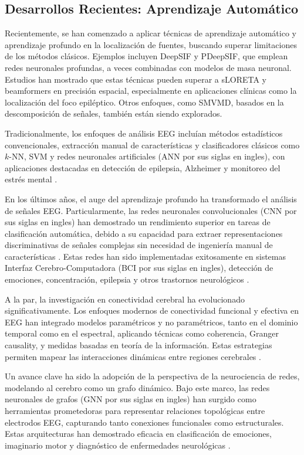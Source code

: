 \subsection{Desarrollos Recientes: Aprendizaje Automático}

Recientemente, se han comenzado a aplicar técnicas de aprendizaje automático y aprendizaje profundo en la localización de fuentes\cite{Sun2022DeepNN}, buscando superar limitaciones de los métodos clásicos. Ejemplos incluyen DeepSIF\cite{Sun2022DeepNN} y PDeepSIF\cite{sun2023pdeepsif}, que emplean redes neuronales profundas, a veces combinadas con modelos de masa neuronal. Estudios han mostrado que estas técnicas pueden superar a sLORETA y beamformers en precisión espacial, especialmente en aplicaciones clínicas como la localización del foco epiléptico. Otros enfoques, como SMVMD, basados en la descomposición de señales, también están siendo explorados\cite{Sun2023DeepMEG}.

 Tradicionalmente, los enfoques de análisis EEG incluían métodos estadísticos convencionales, extracción manual de características y clasificadores clásicos como $k$-NN, SVM y redes neuronales artificiales (ANN por sus siglas en ingles), con aplicaciones destacadas en detección de epilepsia, Alzheimer y monitoreo del estrés mental \cite{Kurniawan2021}.

En los últimos años, el auge del aprendizaje profundo ha transformado el análisis de señales EEG. Particularmente, las redes neuronales convolucionales (CNN por sus siglas en ingles)\cite{Hecker2021CNN} han demostrado un rendimiento superior en tareas de clasificación automática, debido a su capacidad para extraer representaciones discriminativas de señales complejas sin necesidad de ingeniería manual de características \cite{Samal2024}. Estas redes han sido implementadas exitosamente en sistemas Interfaz Cerebro-Computadora (BCI por sus siglas en ingles), detección de emociones, concentración, epilepsia y otros trastornos neurológicos \cite{Kurniawan2021}.

A la par, la investigación en conectividad cerebral ha evolucionado significativamente. Los enfoques modernos de conectividad funcional y efectiva en EEG han integrado modelos paramétricos y no paramétricos, tanto en el dominio temporal como en el espectral, aplicando técnicas como coherencia, Granger causality, y medidas basadas en teoría de la información. Estas estrategias permiten mapear las interacciones dinámicas entre regiones cerebrales \cite{Chiarion2023}.

Un avance clave ha sido la adopción de la perspectiva de la neurociencia de redes, modelando al cerebro como un grafo dinámico. Bajo este marco, las redes neuronales de grafos (GNN por sus siglas en ingles) han surgido como herramientas prometedoras para representar relaciones topológicas entre electrodos EEG, capturando tanto conexiones funcionales como estructurales. Estas arquitecturas han demostrado eficacia en clasificación de emociones, imaginario motor y diagnóstico de enfermedades neurológicas \cite{Klepl2024}.


